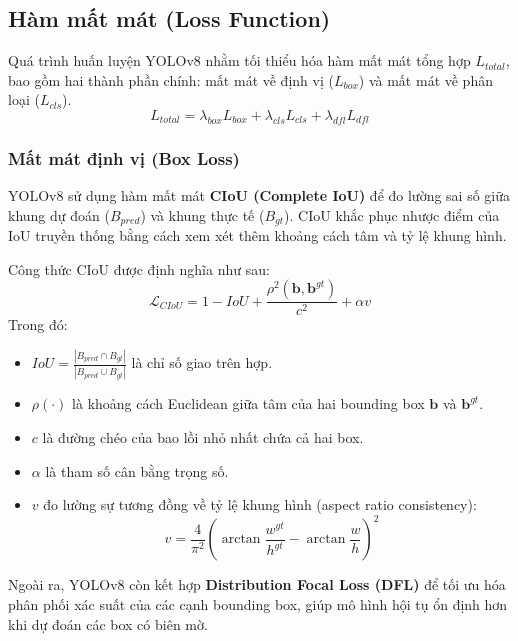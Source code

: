 \subsection{Hàm mất mát (Loss Function)}
Quá trình huấn luyện YOLOv8 nhằm tối thiểu hóa hàm mất mát tổng hợp $L_{total}$, bao gồm hai thành phần chính: mất mát về định vị ($L_{box}$) và mất mát về phân loại ($L_{cls}$).
\begin{equation}
    L_{total} = \lambda_{box} L_{box} + \lambda_{cls} L_{cls} + \lambda_{dfl} L_{dfl}
\end{equation}

\subsubsection{Mất mát định vị (Box Loss)}
YOLOv8 sử dụng hàm mất mát \textbf{CIoU (Complete IoU)} để đo lường sai số giữa khung dự đoán ($B_{pred}$) và khung thực tế ($B_{gt}$). CIoU khắc phục nhược điểm của IoU truyền thống bằng cách xem xét thêm khoảng cách tâm và tỷ lệ khung hình.

Công thức CIoU được định nghĩa như sau:
\begin{equation}
    \mathcal{L}_{CIoU} = 1 - IoU + \frac{\rho^2(\mathbf{b}, \mathbf{b}^{gt})}{c^2} + \alpha v
\end{equation}
Trong đó:
\begin{itemize}
    \item $IoU = \frac{|B_{pred} \cap B_{gt}|}{|B_{pred} \cup B_{gt}|}$ là chỉ số giao trên hợp.
    \item $\rho(\cdot)$ là khoảng cách Euclidean giữa tâm của hai bounding box $\mathbf{b}$ và $\mathbf{b}^{gt}$.
    \item $c$ là đường chéo của bao lồi nhỏ nhất chứa cả hai box.
    \item $\alpha$ là tham số cân bằng trọng số.
    \item $v$ đo lường sự tương đồng về tỷ lệ khung hình (aspect ratio consistency):
    \begin{equation}
        v = \frac{4}{\pi^2} \left( \arctan\frac{w^{gt}}{h^{gt}} - \arctan\frac{w}{h} \right)^2
    \end{equation}
\end{itemize}

Ngoài ra, YOLOv8 còn kết hợp \textbf{Distribution Focal Loss (DFL)} để tối ưu hóa phân phối xác suất của các cạnh bounding box, giúp mô hình hội tụ ổn định hơn khi dự đoán các box có biên mờ.


